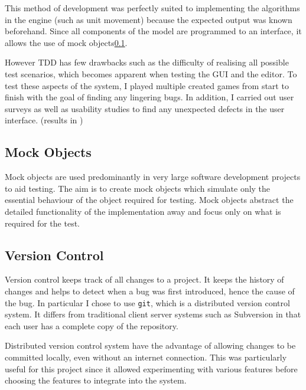 This method of development was perfectly suited to implementing the algorithms in the engine (such as unit movement) because the expected output was known beforehand.  Since all components of the model are programmed to an interface, it allows the use of mock objects\ref{sec:mockobjects}.   


However TDD has few drawbacks such as the difficulty of realising all possible test scenarios, which becomes apparent when testing the GUI and the editor. To test these aspects of the system, I played multiple created games from start to finish with the goal of finding any lingering bugs. In addition, I carried out user surveys as well as usability studies to find any unexpected defects in the user interface. (results in ) 

\subsection{Mock Objects}
\label{sec:mockobjects}
Mock objects are used predominantly in very large software development projects to aid testing. The aim is to create mock objects which simulate only the essential behaviour of the object required for testing. 
Mock objects abstract  the detailed functionality of the implementation away and  focus only on what is required for the test.

\subsection{Version Control}
\label{sub:version_control}
Version control keeps track of all changes to a project. It keeps the history of changes and  helps to detect when a bug was first introduced, hence the cause of the bug. In particular I chose to use \texttt{git}, which is a distributed version control system. It differs from traditional client server systems such as Subversion in that each user has a 
complete copy of the repository. 

Distributed version control system have the advantage of allowing changes to be committed locally, even without an internet connection.  This was particularly useful for this project since it allowed experimenting with various features before choosing the features to integrate into the system.
  

